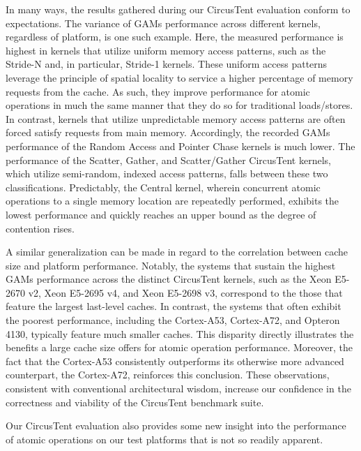 In many ways, the results gathered during our CircusTent evaluation conform to expectations.
The variance of GAMs performance across different kernels, regardless of platform, is one such example.
Here, the measured performance is highest in kernels that utilize uniform memory access patterns, such as the Stride-N and, in particular, Stride-1 kernels.
These uniform access patterns leverage the principle of spatial locality to service a higher percentage of memory requests from the cache.
As such, they improve performance for atomic operations in much the same manner that they do so for traditional loads/stores.
In contrast, kernels that utilize unpredictable memory access patterns are often forced satisfy requests from main memory.
Accordingly, the recorded GAMs performance of the Random Access and Pointer Chase kernels is much lower.
The performance of the Scatter, Gather, and Scatter/Gather CircusTent kernels, which utilize semi-random, indexed access patterns, falls between these two classifications.
Predictably, the Central kernel, wherein concurrent atomic operations to a single memory location are repeatedly performed, exhibits the lowest performance and quickly reaches an upper bound as the degree of contention rises.

A similar generalization can be made in regard to the correlation between cache size and platform performance.
Notably, the systems that sustain the highest GAMs performance across the distinct CircusTent kernels, such as the Xeon E5-2670 v2, Xeon E5-2695 v4, and Xeon E5-2698 v3, correspond to the those that feature the largest last-level caches.
In contrast, the systems that often exhibit the poorest performance, including the Cortex-A53, Cortex-A72, and Opteron 4130, typically feature much smaller caches.
This disparity directly illustrates the benefits a large cache size offers for atomic operation performance.
Moreover, the fact that the Cortex-A53 consistently outperforms its otherwise more advanced counterpart, the Cortex-A72, reinforces this conclusion.
These observations, consistent with conventional architectural wisdom, increase our confidence in the correctness and viability of the CircusTent benchmark suite.

Our CircusTent evaluation also provides some new insight into the performance of atomic operations on our test platforms that is not so readily apparent.
